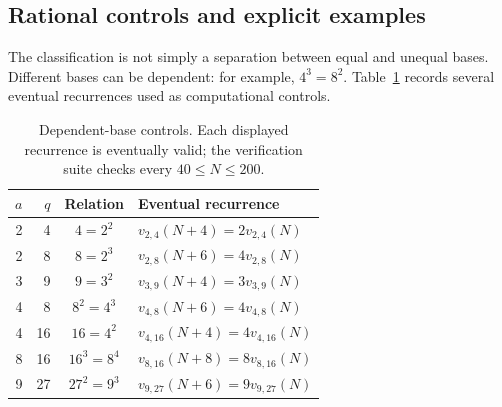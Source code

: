 \documentclass[11pt,letterpaper]{article}
\numberwithin{equation}{section}
\theoremstyle{definition}
\theoremstyle{remark}
\begin{document}
\subsection{Rational controls and explicit examples}
The classification is not simply a separation between equal and unequal
bases. Different bases can be dependent: for example, $4^3=8^2$.
Table~\ref{tab:dependent} records several eventual recurrences used as
computational controls.

\begin{table}[htbp]
\centering
\caption{Dependent-base controls. Each displayed recurrence is eventually
valid; the verification suite checks every $40\le N\le200$.}
\label{tab:dependent}
\begin{tabular}{rrcl}
\toprule
$a$&$q$&Relation&Eventual recurrence\\
\midrule
2&4&$4=2^2$&$v_{2,4}(N+4)=2v_{2,4}(N)$\\
2&8&$8=2^3$&$v_{2,8}(N+6)=4v_{2,8}(N)$\\
3&9&$9=3^2$&$v_{3,9}(N+4)=3v_{3,9}(N)$\\
4&8&$8^2=4^3$&$v_{4,8}(N+6)=4v_{4,8}(N)$\\
4&16&$16=4^2$&$v_{4,16}(N+4)=4v_{4,16}(N)$\\
8&16&$16^3=8^4$&$v_{8,16}(N+8)=8v_{8,16}(N)$\\
9&27&$27^2=9^3$&$v_{9,27}(N+6)=9v_{9,27}(N)$\\
\bottomrule
\end{tabular}
\end{table}
\end{document}
